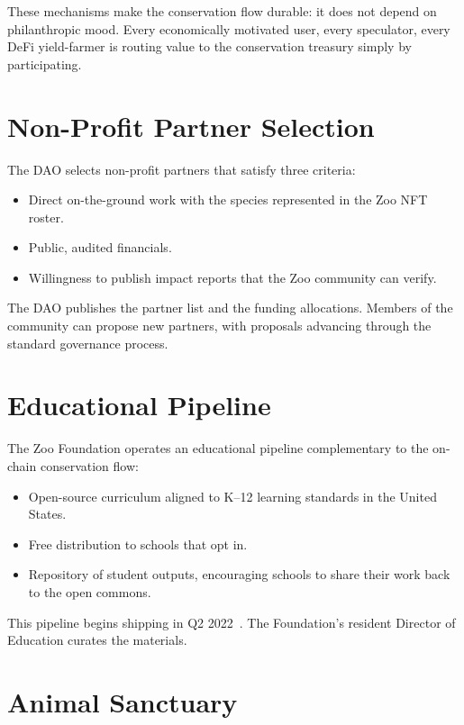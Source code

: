 \documentclass[11pt,letterpaper]{article}
\begin{document}
These mechanisms make the conservation flow durable: it does not depend on philanthropic mood. Every economically motivated user, every speculator, every DeFi yield-farmer is routing value to the conservation treasury simply by participating.

\section{Non-Profit Partner Selection}

The DAO selects non-profit partners that satisfy three criteria:

\begin{itemize}
  \item Direct on-the-ground work with the species represented in the Zoo NFT roster.
  \item Public, audited financials.
  \item Willingness to publish impact reports that the Zoo community can verify.
\end{itemize}

The DAO publishes the partner list and the funding allocations. Members of the community can propose new partners, with proposals advancing through the standard governance process.

\section{Educational Pipeline}

The Zoo Foundation operates an educational pipeline complementary to the on-chain conservation flow:

\begin{itemize}
  \item Open-source curriculum aligned to K--12 learning standards in the United States.
  \item Free distribution to schools that opt in.
  \item Repository of student outputs, encouraging schools to share their work back to the open commons.
\end{itemize}

This pipeline begins shipping in Q2 2022~\cite{zoo2021}. The Foundation's resident Director of Education curates the materials.

\section{Animal Sanctuary}
\end{document}
